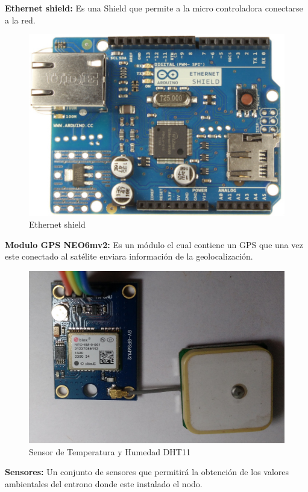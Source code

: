 \setlength{\parindent}{0ex}\textbf{Ethernet shield:} Es una Shield que permite a la micro controladora conectarse a la red.

\begin{figure}[!h]
	\centering
	\includegraphics[width=0.3\linewidth]{figuras/ethshi}
	\caption{Ethernet shield}
	\label{fig:imgethshi}
\end{figure}

\setlength{\parindent}{0ex}\textbf{Modulo GPS NEO6mv2: }Es un módulo el cual contiene un GPS que una vez este conectado al satélite enviara información de la geolocalización.

	\begin{figure}[!h]
		\centering
		\includegraphics[width=0.6\linewidth]{figuras/neo6mv2}
		\caption{Sensor de Temperatura y Humedad DHT11}
		\label{fig:dht11}
	\end{figure}


\setlength{\parindent}{0ex}\textbf{Sensores:} Un conjunto de sensores que permitirá la obtención de los valores ambientales del entrono donde este instalado el nodo.

